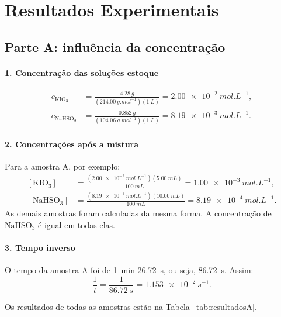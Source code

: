\section{Resultados Experimentais}

\subsection{Parte A: influência da concentração}

\paragraph{1. Concentração das soluções estoque}
\[
\begin{aligned}
c_{\mathrm{KIO_3}} &= \frac{\SI{4,28}{g}}{\left(\SI{214,00}{g.mol^{-1}}\right)\left(\SI{1}{L}\right)} = \SI{2,00e-2}{mol.L^{-1}},\\
c_{\mathrm{NaHSO_3}} &= \frac{\SI{0,852}{g}}{\left(\SI{104,06}{g.mol^{-1}}\right)\left(\SI{1}{L}\right)} = \SI{8,19e-3}{mol.L^{-1}}.
\end{aligned}
\]

\paragraph{2. Concentrações após a mistura}
Para a amostra A, por exemplo:
\[
\begin{aligned}
[\mathrm{KIO_3}] &= \frac{\left(\SI{2,00e-2}{mol.L^{-1}}\right)\left(\SI{5,00}{mL}\right)}{\SI{100}{mL}} = \SI{1,00e-3}{mol.L^{-1}},\\
[\mathrm{NaHSO_3}] &= \frac{\left(\SI{8,19e-3}{mol.L^{-1}}\right)\left(\SI{10,00}{mL}\right)}{\SI{100}{mL}} = \SI{8,19e-4}{mol.L^{-1}}.
\end{aligned}
\]
As demais amostras foram calculadas da mesma forma. A concentração de $\mathrm{NaHSO_3}$ é igual em todas elas.

\paragraph{3. Tempo inverso}
O tempo da amostra A foi de \SI{1}{min} \SI{26,72}{s}, ou seja, \SI{86,72}{s}. Assim:
\[
\frac{1}{t} = \frac{1}{\SI{86,72}{s}} = \SI{1,153e-2}{s^{-1}}.
\]

Os resultados de todas as amostras estão na Tabela~\ref{tab:resultadosA}.

